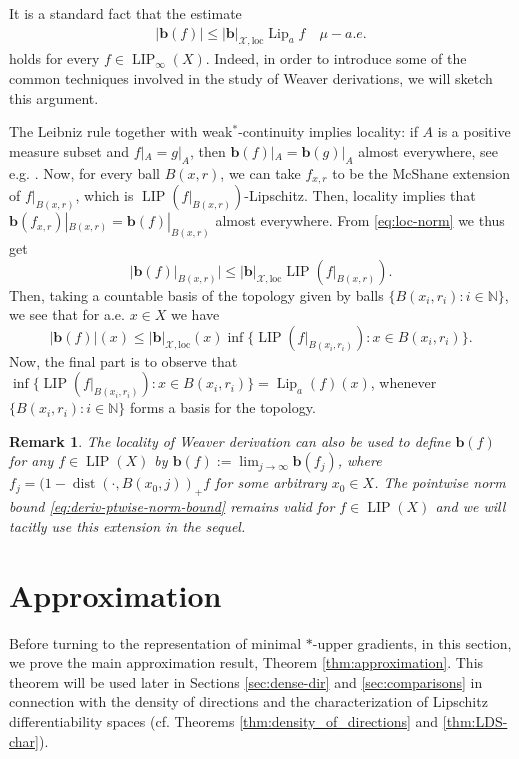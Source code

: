 \documentclass{amsart}
\newtheorem{remark}[theorem]{Remark}
\numberwithin{equation}{section}
\newcommand{\N}{\mathbb{N}}
\newcommand{\dist}{\operatorname{dist}}
\newcommand{\Lip}{\operatorname{Lip}}
\newcommand{\LIP}{\operatorname{LIP}}
\newcommand{\loc}{\mathrm{loc}}
\begin{document}
It is a standard fact that the estimate
\begin{align}\label{eq:deriv-ptwise-norm-bound}
	|\bm b(f)|\le |\bm b|_{\mathcal X,\loc}\Lip_af\quad \mu-a.e.
\end{align}
holds for every $f\in \LIP_\infty(X)$. Indeed, in order to introduce some of the common techniques involved in the study of Weaver derivations, we will sketch this argument. 

The Leibniz rule together with weak$^*$-continuity implies locality: if $A$ is a positive measure subset and $f|_A=g|_A$, then $\bm b(f)|_A=\bm b(g)|_A$ almost everywhere, see e.g. \cite[Lemma 13.4]{heinonen2007nonsmooth}. Now, for every ball $B(x,r)$, we can take $f_{x,r}$ to be the McShane extension of $f|_{B(x,r)}$, which is $\LIP(f|_{B(x,r)})$-Lipschitz. Then, locality implies that $\bm b(f_{x,r})|_{B(x,r)}=\bm b(f)|_{B(x,r)}$ almost everywhere. From \eqref{eq:loc-norm} we thus get 
\[
|\bm b(f)|_{B(x,r)}|\leq |\bm b|_{\mathcal X,\loc}\LIP(f|_{B(x,r)}).
\]
Then, taking a countable basis of the topology given by balls $\{B(x_i,r_i) : i\in \N\}$, we see that for a.e. $x\in X$ we have 
\[
|\bm b(f)|(x)\leq |\bm b|_{\mathcal X,\loc}(x)\inf\{\LIP(f|_{B(x_i,r_i)}): x\in B(x_i,r_i) \}. 
\]
Now, the final part is to observe that $\inf\{\LIP(f|_{B(x_i,r_i)}): x\in B(x_i,r_i) \} = \Lip_a(f)(x)$, whenever $\{B(x_i,r_i) : i\in \N\}$ forms a basis for the topology.

\begin{remark}\label{rmk:extend-deriv-to-LIP}
    The locality of Weaver derivation can also be used to define $\bm b(f)$ for any $f\in \LIP(X)$ by $\bm b(f):=\lim_{j\to\infty}\bm b(f_j)$, where $f_j=(1-\dist(\cdot,B(x_0,j))_+f$ for some arbitrary $x_0\in X$. The pointwise norm bound \eqref{eq:deriv-ptwise-norm-bound} remains valid for $f\in \LIP(X)$ and we will tacitly use this extension in the sequel.
\end{remark}



\section{Approximation}\label{sec:approximation}

Before turning to the representation of minimal $\ast$-upper gradients, in this section, we prove the main approximation result, Theorem \ref{thm:approximation}. This theorem will be used later in Sections \ref{sec:dense-dir} and \ref{sec:comparisons} in connection with the density of directions and the characterization of Lipschitz differentiability spaces (cf. Theorems \ref{thm:density_of_directions} and \ref{thm:LDS-char}).
\end{document}
